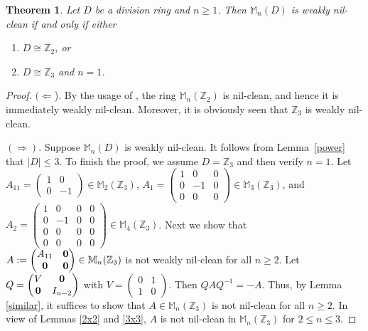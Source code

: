 \documentclass[12]{amsart}
\newtheorem{thm}{Theorem}
\theoremstyle{definition}
\numberwithin{equation}{section}
\begin{document}
\begin{thm}\label{main}
Let $D$ be a division ring and $n\ge 1$. Then ${\mathbb M}_n(D)$ is weakly nil-clean if and only if either
\begin{enumerate} \item $D\cong \mathbb Z_2$, or
\item $D\cong \mathbb Z_3$ and $n=1$.
\end{enumerate}
\end{thm}
\begin{proof}
$(\Leftarrow$). By the usage of \cite{BCDM13}, the ring ${\mathbb M}_n(\mathbb Z_2)$ is nil-clean, and hence it is immediately weakly nil-clean. Moreover, it is obviously seen that $\mathbb Z_3$ is weakly nil-clean.

$(\Rightarrow )$. Suppose  ${\mathbb M}_n(D)$ is weakly nil-clean. It follows from Lemma~\ref{power} that $|D|\le 3$. To finish the proof, we assume
$D=\mathbb Z_3$ and then verify $n=1$. Let $A_{11}=\begin{pmatrix}1&0\\
                       0&-1\end{pmatrix}\in {\mathbb M}_2(\mathbb Z_3)$, $A_{1}=\begin{pmatrix}1&0&0\\
                       0&-1&0\\
											0&0&0\end{pmatrix}\in {\mathbb M}_3(\mathbb Z_3)$, and $A_{2}=\begin{pmatrix}1&0&0&0\\
                       0&-1&0&0\\
											0&0&0&0\\
											0&0&0&0\end{pmatrix}\in {\mathbb M}_4(\mathbb Z_3)$.  Next we show that  $A:=\begin{pmatrix}A_{11}&\bf 0\\
                       \bf 0&\bf 0\end{pmatrix}\in{\mathbb M}_n(\mathbb Z_3)$ is not weakly nil-clean for all $n\ge 2$. Let $Q=\begin{pmatrix}V&\bf 0\\
                       \bf 0&I_{n-2}\end{pmatrix}$ with $V=\begin{pmatrix}0&1\\
                       1&0\end{pmatrix}$. Then $QAQ^{-1}=-A$. Thus, by Lemma \ref{similar}, it suffices to show that $A\in{\mathbb M}_n(\mathbb Z_3)$ is not nil-clean for all $n\ge 2$. In view of Lemmas \ref{2x2} and \ref{3x3}, $A$ is not nil-clean in  ${\mathbb M}_n(\mathbb Z_3)$ for $2\leq n\leq 3$.
											

\end{proof}
\end{document}

